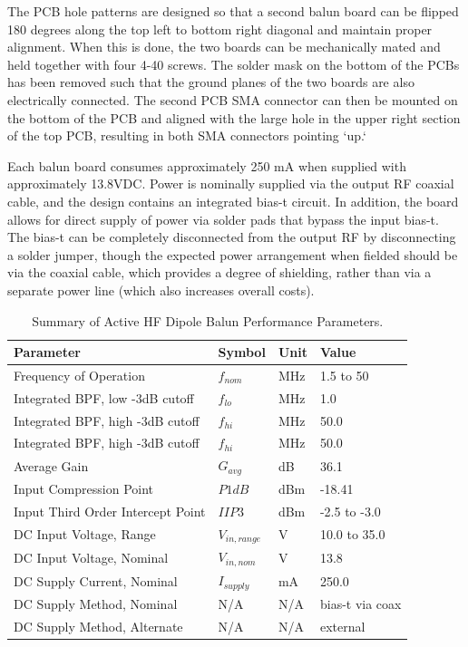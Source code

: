The PCB hole patterns are designed so that a second balun board can be flipped 180 degrees along the top left to bottom right diagonal and maintain proper alignment.
When this is done, the two boards can be mechanically mated and held together with four 4-40 screws.
The solder mask on the bottom of the PCBs has been removed such that the ground planes of the two boards are also electrically connected.
The second PCB SMA connector can then be mounted on the bottom of the PCB and aligned with the large hole in the upper right section of the top PCB, resulting in both SMA connectors pointing `up.`

Each balun board consumes approximately 250 mA when supplied with approximately 13.8VDC.
Power is nominally supplied via the output RF coaxial cable, and the design contains an integrated bias-t circuit.
In addition, the board allows for direct supply of power via solder pads that bypass the input bias-t.
The bias-t can be completely disconnected from the output RF by disconnecting a solder jumper, though the expected power arrangement when fielded should be via the coaxial cable, which provides a degree of shielding, rather than via a separate power line (which also increases overall costs).

\begin{table}[h!]
\begin{center}
\caption{Summary of Active HF Dipole Balun Performance Parameters.}
\label{table:ahfdb_features}
\begin{tabular}{|l|l|l|l|}
	\hline
	\textbf{Parameter} & \textbf{Symbol} & \textbf{Unit} & \textbf{Value}\\
	\hline
	Frequency of Operation & $f_{nom}$  & MHz & 1.5 to 50 \\
	\hline
	Integrated BPF, low -3dB cutoff & $f_{lo}$ & MHz & 1.0 \\
	\hline
	Integrated BPF, high -3dB cutoff & $f_{hi}$ & MHz & 50.0 \\
	\hline
	Integrated BPF, high -3dB cutoff & $f_{hi}$ & MHz & 50.0 \\
	\hline
	Average Gain & $G_{avg}$ & dB & 36.1\\
	\hline
	Input Compression Point & $P1dB$ & dBm & -18.41 \\
	\hline
	Input Third Order Intercept Point & $IIP3$ & dBm & -2.5 to -3.0 \\
	\hline
	DC Input Voltage, Range & $V_{in,range}$ & V & 10.0 to 35.0 \\
	\hline
	DC Input Voltage, Nominal & $V_{in,nom}$ & V & 13.8 \\
	\hline
	DC Supply Current, Nominal & $I_{supply}$ & mA & 250.0 \\
	\hline
	DC Supply Method, Nominal & N/A & N/A & bias-t via coax \\
	\hline
	DC Supply Method, Alternate & N/A & N/A & external \\
	\hline	
	
\end{tabular}
\end{center}
\end{table}



